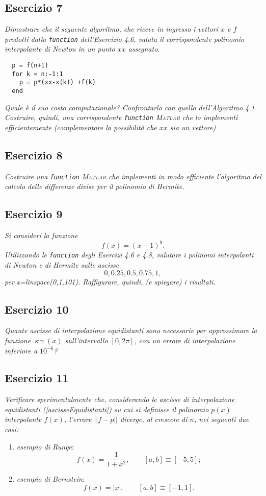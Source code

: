 \subsection{Esercizio 7}
\label{sub:Esercizio 7}
\emph{Dimostrare che il seguente algoritmo, che riceve in ingresso i vettori $x$ e $f$ prodotti dalla \lstinline{function} dell'Esercizio 4.6, valuta il corrispondente polinomio interpolante di Newton in un punto $xx$
assegnato.}\\
\lstset{language=Matlab}
\begin{lstlisting}
  p = f(n+1)
  for k = n:-1:1
  	p = p*(xx-x(k)) +f(k)
  end
\end{lstlisting}
\emph{Quale è il suo costo computazionale? Confrontarlo con quello dell'Algoritmo 4.1. Costruire, quindi, una corrispondente \lstinline{function} \textsc{Matlab} che lo implementi efficientemente (complementare la possibilità che $xx$ sia un vettore)}

\subsection{Esercizio 8}
\label{sub:Esercizio 8}
\emph{Costruire una \lstinline{function} \textsc{Matlab} che implementi in modo efficiente l'algoritmo del calcolo delle differenze divise per il polinomio di Hermite.}

\subsection{Esercizio 9}
\label{sub:Esercizio 9}
\emph{Si consideri la funzione
$$f(x)=(x-1)^9.$$
Utilizzando le \lstinline{function} degli Esercizi 4.6 e 4.8, valutare i polinomi interpolanti di Newton e di Hermite sulle ascisse
$$0,0.25,0.5,0.75,1,$$
per x=linspace(0,1,101). Raffigurare, quindi, (e spiegare) i risultati.}

\subsection{Esercizio 10}
\label{sub:Esercizio 10}
\emph{Quante ascisse di interpolazione equidistanti sono necessarie per approssimare la funzione $\sin(x)$ sull'intervallo $[0,2\pi]$, con un errore di interpolazione inferiore a $10^{-6}$?}

\subsection{Esercizio 11}
\label{sub:Esercizio 11}
\emph{Verificare sperimentalmente che, considerando le ascisse di interpolazione equidistanti (\ref{ascisseEquidistanti}) su cui si definisce il polinomio $p(x)$ interpolante $f(x)$, l'errore $||f-p||$ diverge, al crescere di $n$, nei seguenti due casi:}
			\begin{enumerate}
				\item \emph{esempio di Runge}:
					$$f(x)=\frac{1}{1+x^2},\qquad [a,b]\equiv[-5,5];$$
				\item \emph{esempio di Bernstein}:
					$$f(x)=|x|,\qquad [a,b]\equiv[-1,1].$$
			\end{enumerate}

